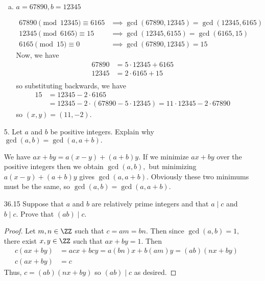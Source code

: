 \documentclass{article}
\begin{document}
\begin{itemize}
\begin{enumerate}[(a)]
			\item $a=67890, b=12345$
				\begin{soln}
					\begin{align*}
						67890 \pmod {12345} \equiv 6165 &\implies \gcd(67890, 12345) = \gcd(12345, 6165) \\
						12345 \pmod{6165} \equiv 15 &\implies \gcd(12345, 6155) = \gcd(6165, 15) \\
						6165 \pmod{15} \equiv 0 &\implies \gcd(67890, 12345) = \boxed{15}
					\end{align*}
					Now, we have
					\begin{align*}
						67890 &= 5\cdot 12345 + 6165 \\
						12345 &= 2\cdot 6165 + 15 \\
					\end{align*}
					so substituting backwards, we have
					\begin{align*}
						15 &= 12345 - 2\cdot 6165 \\
						&= 12345 - 2\cdot(67890-5\cdot 12345) = 11\cdot 12345 - 2\cdot 67890
					\end{align*}
					so $(x, y) = (11, -2).$
				\end{soln}
				
		\end{enumerate}

	\item[5.] Let $a$ and $b$ be positive integers. Explain why $\gcd(a, b)=\gcd(a, a+b).$ 
		\begin{soln}
			We have $ax+by = a(x-y) + (a+b)y.$ If we minimize $ax+by$ over the positive integers then we obtain $\gcd(a, b),$ but minimizing $a(x-y) + (a+b)y$ gives $\gcd(a, a+b).$ Obviously these two minimums must be the same, so $\gcd(a, b) = \gcd(a, a+b).$
		\end{soln}

	\item[36.15] Suppose that $a$ and $b$ are relatively prime integers and that $a\mid c$ and $b\mid c.$ Prove that $(ab)\mid c.$
		\begin{proof}
			Let $m, n\in \ZZ$ such that $c=am=bn.$ Then since $\gcd(a, b)=1,$ there exist $x, y\in\ZZ$ such that $ax+by=1.$ Then
			\begin{align*}
				c(ax+by) &= acx + bcy = a(bn)x + b(am)y = (ab)(nx + by) \\
				c(ax+by) &= c
			\end{align*}
			Thus, $c=(ab)(nx+by)$ so $(ab)\mid c$ as desired.
		\end{proof}


\end{itemize}
\end{document}
